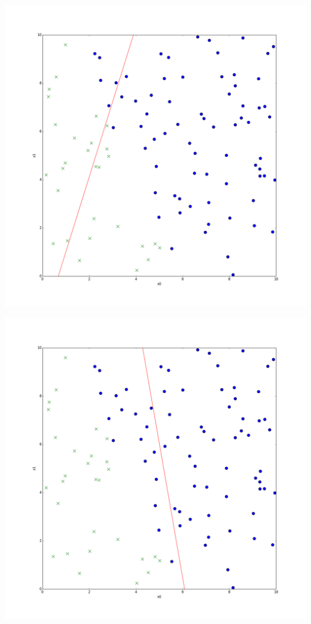 \begin{frame}
  \begin{center}
    \includegraphics[scale=0.2]{./pictures/logreg_db001.png}
  \end{center}
\end{frame}

\begin{frame}
  \begin{center}
    \includegraphics[scale=0.2]{./pictures/logreg_db012.png}
  \end{center}
\end{frame}

